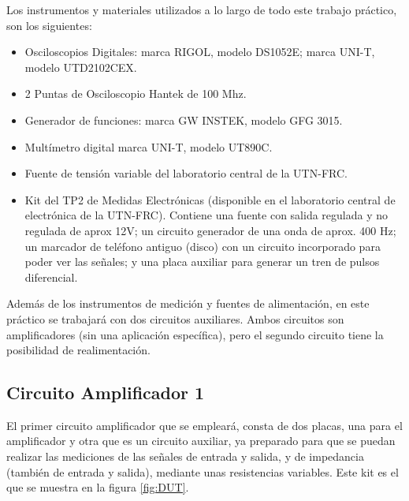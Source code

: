 

Los instrumentos y materiales utilizados a lo largo de todo este trabajo práctico, son los siguientes:

\begin{itemize}
    \item Osciloscopios Digitales: marca RIGOL, modelo DS1052E; marca UNI-T, modelo UTD2102CEX.
    \item 2 Puntas de Osciloscopio Hantek de 100 Mhz.
    \item Generador de funciones: marca GW INSTEK, modelo GFG 3015.
    \item Multímetro digital marca UNI-T, modelo UT890C.
    \item Fuente de tensión variable del laboratorio central de la UTN-FRC.
    \item Kit del TP2 de Medidas Electrónicas (disponible en el laboratorio central de electrónica de la UTN-FRC). Contiene una fuente con salida regulada y no regulada de aprox 12V; un circuito generador de una onda de aprox. 400 Hz; un marcador de teléfono antiguo (disco) con un circuito incorporado para poder ver las señales; y una placa auxiliar para generar un tren de pulsos diferencial.
    
\end{itemize}



Además de los instrumentos de medición y fuentes de alimentación, en este práctico se trabajará con dos circuitos auxiliares. Ambos circuitos son amplificadores (sin una aplicación específica), pero el segundo circuito tiene la posibilidad de realimentación.

\subsection{Circuito Amplificador 1}
\label{sec:Amp1}

El primer circuito amplificador que se empleará, consta de dos placas, una para el amplificador y otra que es un circuito auxiliar, ya preparado para que se puedan realizar las mediciones de las señales de entrada y salida, y de impedancia (también de entrada y salida), mediante unas resistencias variables. Este kit es el que se muestra en la figura \ref{fig:DUT}. 


